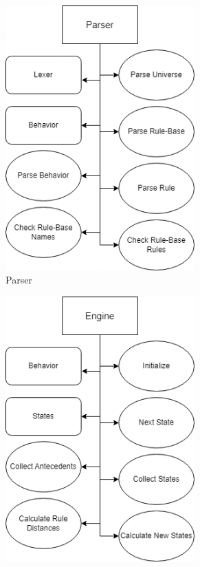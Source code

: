 \begin{figure}[!h]
\centering
\begin{subfigure}{.5\textwidth}
	\centering
	\includegraphics[width=0.8\textwidth]{images/parserUML}
	\caption{Parser}
	\label{fig:parserUML}
\end{subfigure}%
\begin{subfigure}{.5\textwidth}
	\centering
	\includegraphics[width=0.8\textwidth]{images/engineUML}

\end{subfigure}
\end{figure}
